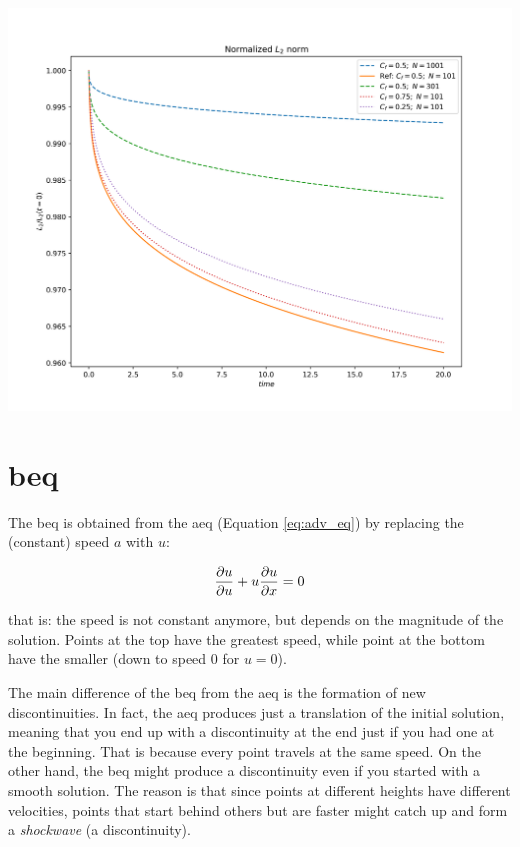 \documentclass[11pt, a4paper]{article}
\begin{document}
\begin{center}
    \centering
    \includegraphics[width=0.9\linewidth]{images/L2_STEP_LAX-W.png}
    \label{fig:step_laxw_l2_tot}
\end{center}

\section{\acrfull{beq}}

The \acrlong{beq} is obtained from the \acrlong{aeq} (Equation \ref{eq:adv_eq})
by replacing the (constant) speed \(a\) with \(u\):

\begin{equation} \label{eq:burg_eq_nc}
    \pdv{u}{u} + u \pdv{u}{x} = 0
\end{equation}

\noindent
that is: the speed is not constant anymore, but depends on the magnitude of the
solution. Points at the top have the greatest speed, while point at the bottom
have the smaller (down to speed \(0\) for \(u = 0\)).

The main difference of the \acrshort{beq} from the \acrshort{aeq} is the
formation of new discontinuities. In fact, the \acrshort{aeq} produces just a
translation of the initial solution, meaning that you end up with a discontinuity
at the end just if you had one at the beginning. That is because every point
travels at the same speed. On the other hand, the \acrshort{beq} might produce
a discontinuity even if you started with a smooth solution. The reason is that
since points at different heights have different velocities, points that start
behind others but are faster might catch up and form a \textit{shockwave}
(a discontinuity).
\end{document}
